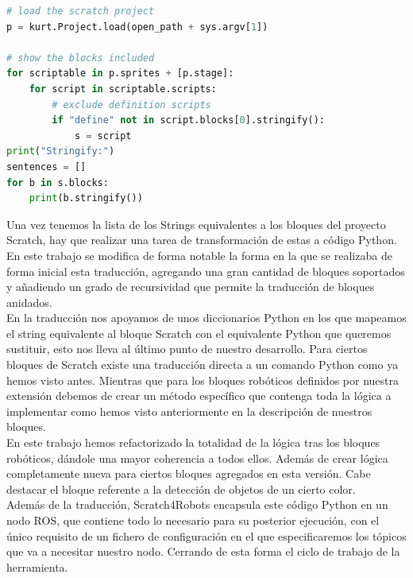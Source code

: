 \begin{lstlisting}[language=python,firstnumber=1]
# load the scratch project
p = kurt.Project.load(open_path + sys.argv[1])

# show the blocks included
for scriptable in p.sprites + [p.stage]:
	for script in scriptable.scripts:
		# exclude definition scripts
		if "define" not in script.blocks[0].stringify():
			s = script
print("Stringify:")
sentences = []
for b in s.blocks:
	print(b.stringify())
\end{lstlisting}

Una vez tenemos la lista de los Strings equivalentes a los bloques del proyecto Scratch, hay que realizar una tarea de transformación de estas a código Python.\\

En este trabajo se modifica de forma notable la forma en la que se realizaba de forma inicial esta traducción, agregando una gran cantidad de bloques soportados y añadiendo un grado de recursividad que permite la traducción de bloques anidados.\\

En la traducción nos apoyamos de unos diccionarios Python en los que mapeamos el string equivalente al bloque Scratch con el equivalente Python que queremos sustituir, esto nos lleva al último punto de nuestro desarrollo. Para ciertos bloques de Scratch existe una traducción directa a un comando Python como ya hemos visto antes. Mientras que para los bloques robóticos definidos por nuestra extensión debemos de crear un método específico que contenga toda la lógica a implementar como hemos visto anteriormente en la descripción de nuestros bloques.\\

En este trabajo hemos refactorizado la totalidad de la lógica tras los bloques robóticos, dándole una mayor coherencia a todos ellos. Además de crear lógica completamente nueva para ciertos bloques agregados en esta versión. Cabe destacar el bloque referente a la detección de objetos de un cierto color.\\

Además de la traducción, Scratch4Robots encapsula este código Python en un nodo ROS, que contiene todo lo necesario para su posterior ejecución, con el único requisito de un fichero de configuración en el que especificaremos los tópicos que va a necesitar nuestro nodo. Cerrando de esta forma el ciclo de trabajo de la herramienta.\\





